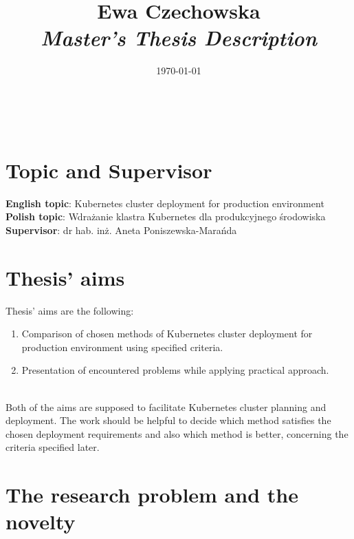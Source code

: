 \documentclass[12pt]{article}
\title{
{\small Ewa Czechowska } \\
\bf\textit{ Master’s Thesis Description } \\
\vspace{4cm}}
\date{\today}
\begin{document}
\maketitle
~\vspace{8cm}
\newpage
\thispagestyle{empty}

\section{Topic and Supervisor}
\textbf{English topic}: Kubernetes cluster deployment for production environment
\\
\textbf{Polish topic}: Wdrażanie klastra Kubernetes dla produkcyjnego środowiska
\\
\textbf{Supervisor}: dr hab. inż. Aneta Poniszewska-Marańda

\section{Thesis' aims}
Thesis' aims are the following:
\begin{enumerate}
    \item Comparison of chosen methods of Kubernetes cluster deployment for production environment using specified criteria. 
    \item Presentation of encountered problems while applying practical approach.
\end{enumerate}

~\\

Both of the aims are supposed to facilitate Kubernetes cluster planning and deployment. The work should be helpful to decide which method satisfies the chosen deployment requirements and also which method is better, concerning the criteria specified later.


\section{The research problem and the novelty}
\end{document}

